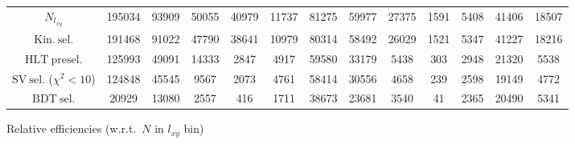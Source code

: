 \documentclass[10pt,a4paper]{article}
\begin{document}
\begin{landscape}
{\begin{tabular}{c|cccc|cccc|cccc}
\midrule
$N_{l_{xy}}$ & 195034 & 93909 & 50055 & 40979 & 11737 & 81275 & 59977 & 27375 & 1591 & 5408 & 41406 & 18507\\
$\mathrm{Kin.\ sel.}$ & 191468 & 91022 & 47790 & 38641 & 10979 & 80314 & 58492 & 26029 & 1521 & 5347 & 41227 & 18216\\
$\mathrm{HLT\ presel.}$ & 125993 & 49091 & 14333 & 2847 & 4917 & 59580 & 33179 & 5438 & 303 & 2948 & 21320 & 5538\\
$\mathrm{SV\ sel.}$ ($\chi^2{<}10$) & 124848 & 45545 & 9567 & 2073 & 4761 & 58414 & 30556 & 4658 & 239 & 2598 & 19149 & 4772\\
$\mathrm{BDT\ sel.}$ & 20929 & 13080 & 2557 & 416 & 1711 & 38673 & 23681 & 3540 & 41 & 2365 & 20490 & 5341\\
\bottomrule
\end{tabular}}

\vspace{18pt}

Relative efficiencies (w.r.t.\ $N$ in $l_{xy}$ bin)


\end{landscape}
\end{document}
